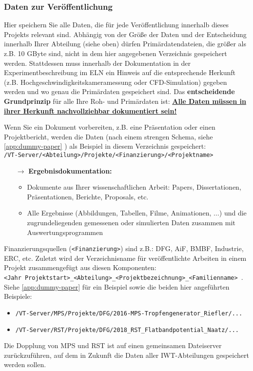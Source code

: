 \subsubsection{Daten zur Veröffentlichung}\label{ssc:data-for-publication}

Hier speichern Sie alle Daten, die für jede Veröffentlichung innerhalb dieses
Projekts relevant sind. Abhängig von der Größe der Daten und der Entscheidung
innerhalb Ihrer Abteilung (siehe oben) dürfen Primärdatendateien, die größer als
z.B. 10 GByte sind, nicht in dem hier angegebenen Verzeichnis gespeichert
werden. Stattdessen muss innerhalb der Dokumentation in der
Experimentbeschreibung im ELN ein Hinweis auf die entsprechende Herkunft (z.B.
Hochgeschwindigkeitskameramessung oder CFD-Simulation) gegeben werden und wo
genau die Primärdaten gespeichert sind. Das \textbf{entscheidende Grundprinzip}
für alle Ihre Roh- und Primärdaten ist: \textbf{\underline{Alle Daten müssen in
ihrer Herkunft nachvollziehbar dokumentiert sein!}}

Wenn Sie ein Dokument vorbereiten, z.B. eine Präsentation oder einen
Projektbericht, werden die Daten (nach einem strengen Schema, siehe \ref{app:dummy-paper} ) als Beispiel in diesem Verzeichnis gespeichert: \\
\texttt{/VT-Server/<Abteilung>/Projekte/<Finanzierung>/<Projektname>}
\begin{itemize}
  \item[$\rightarrow$] \textbf{Ergebnisdokumentation:}
    \begin{itemize}
      \item Dokumente aus Ihrer wissenschaftlichen Arbeit: Papers,
            Dissertationen, Präsentationen, Berichte, Proposals, etc.
      \item Alle Ergebnisse (Abbildungen, Tabellen, Filme, Animationen, ...)
            und die zugrundeliegenden gemessenen oder simulierten Daten
            zusammen mit Auswertungsprogrammen
    \end{itemize}
\end{itemize}
Finanzierungsquellen (\texttt{<Finanzierung>}) sind z.B.: DFG, AiF, BMBF, Industrie, ERC, etc. Zuletzt wird der Verzeichnisname für veröffentlichte Arbeiten in einem Projekt zusammengefügt aus diesen Komponenten: \\
\texttt{<Jahr Projektstart>\_<Abteilung>\_<Projektbezeichnung>\_<Familienname> }.
Siehe \ref{app:dummy-paper} für ein Beispiel sowie die beiden hier angeführten
Beispiele:
\begin{itemize}
  \item \texttt{/VT-Server/MPS/Projekte/DFG/2016-MPS-Tropfengenerator\_Riefler/...}
  \item \texttt{/VT-Server/RST/Projekte/DFG/2018\_RST\_Flatbandpotential\_Naatz/...}
\end{itemize}
Die Dopplung von MPS und RST ist auf einen gemeinsamen Dateiserver
zurückzuführen, auf dem in Zukunft die Daten aller IWT-Abteilungen
gespeichert werden sollen.

